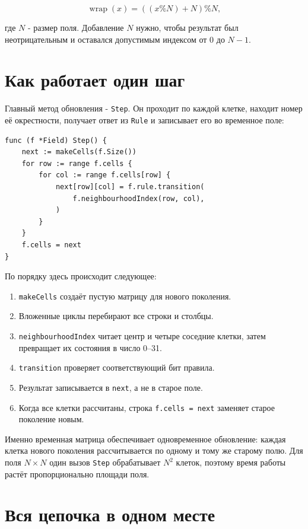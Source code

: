 \documentclass[12pt,a4paper]{article}
\newcommand{\code}[1]{\texttt{#1}}
\newcommand{\sectiontitle}[1]{\section{\color{ink}#1}}
\begin{document}
\[
\operatorname{wrap}(x)=((x\%N)+N)\%N,
\]

где $N$ - размер поля. Добавление $N$ нужно, чтобы результат был
неотрицательным и оставался допустимым индексом от 0 до $N-1$.

\sectiontitle{Как работает один шаг}

Главный метод обновления - \code{Step}. Он проходит по каждой клетке,
находит номер её окрестности, получает ответ из \code{Rule} и записывает
его во временное поле:

\begin{lstlisting}[style=gostyle]
func (f *Field) Step() {
    next := makeCells(f.Size())
    for row := range f.cells {
        for col := range f.cells[row] {
            next[row][col] = f.rule.transition(
                f.neighbourhoodIndex(row, col),
            )
        }
    }
    f.cells = next
}
\end{lstlisting}

По порядку здесь происходит следующее:

\begin{enumerate}
  \item \code{makeCells} создаёт пустую матрицу для нового поколения.
  \item Вложенные циклы перебирают все строки и столбцы.
  \item \code{neighbourhoodIndex} читает центр и четыре соседние клетки,
        затем превращает их состояния в число 0--31.
  \item \code{transition} проверяет соответствующий бит правила.
  \item Результат записывается в \code{next}, а не в старое поле.
  \item Когда все клетки рассчитаны, строка \code{f.cells = next} заменяет
        старое поколение новым.
\end{enumerate}

Именно временная матрица обеспечивает одновременное обновление: каждая
клетка нового поколения рассчитывается по одному и тому же старому полю.
Для поля $N\times N$ один вызов \code{Step} обрабатывает $N^2$ клеток,
поэтому время работы растёт пропорционально площади поля.

\sectiontitle{Вся цепочка в одном месте}
\end{document}
